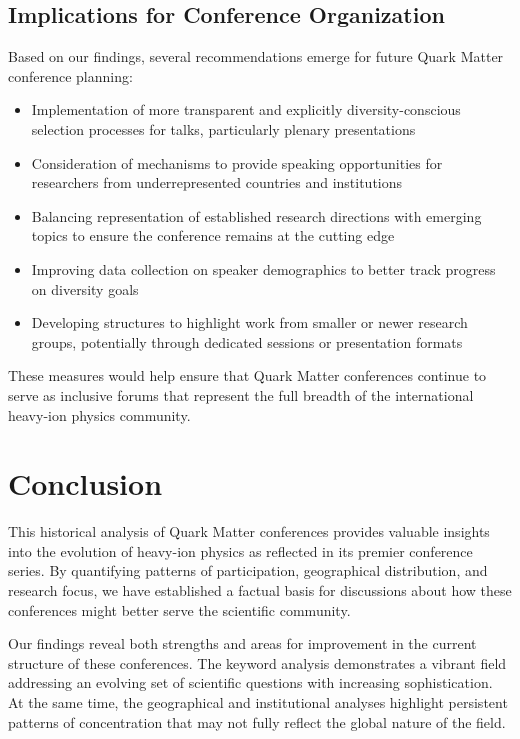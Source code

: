 \documentclass[a4paper,11pt]{article}
\begin{document}
\subsection{Implications for Conference Organization}

Based on our findings, several recommendations emerge for future Quark Matter conference planning:

\begin{itemize}
    \item Implementation of more transparent and explicitly diversity-conscious selection processes for talks, particularly plenary presentations
    \item Consideration of mechanisms to provide speaking opportunities for researchers from underrepresented countries and institutions
    \item Balancing representation of established research directions with emerging topics to ensure the conference remains at the cutting edge
    \item Improving data collection on speaker demographics to better track progress on diversity goals
    \item Developing structures to highlight work from smaller or newer research groups, potentially through dedicated sessions or presentation formats
\end{itemize}

These measures would help ensure that Quark Matter conferences continue to serve as inclusive forums that represent the full breadth of the international heavy-ion physics community.

\section{Conclusion}

This historical analysis of Quark Matter conferences provides valuable insights into the evolution of heavy-ion physics as reflected in its premier conference series. By quantifying patterns of participation, geographical distribution, and research focus, we have established a factual basis for discussions about how these conferences might better serve the scientific community.

Our findings reveal both strengths and areas for improvement in the current structure of these conferences. The keyword analysis demonstrates a vibrant field addressing an evolving set of scientific questions with increasing sophistication. At the same time, the geographical and institutional analyses highlight persistent patterns of concentration that may not fully reflect the global nature of the field.
\end{document}
